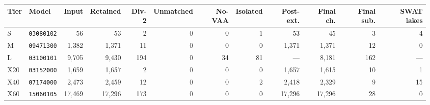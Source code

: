 \begin{tabular}{@{}llrrrrrrrrrr@{}}
\toprule
Tier & Model & Input & Retained & Div-2 & Unmatched & No-VAA & Isolated & Post-ext. & Final ch. & Final sub. & SWAT lakes \\
\midrule
S & \texttt{03080102} & 56 & 53 & 2 & 0 & 0 & 1 & 53 & 45 & 3 & 4 \\
M & \texttt{09471300} & 1{,}382 & 1{,}371 & 11 & 0 & 0 & 0 & 1{,}371 & 1{,}371 & 12 & 0 \\
L & \texttt{03100101} & 9{,}705 & 9{,}430 & 194 & 0 & 34 & 81 & --- & 8{,}181 & 162 & --- \\
X20 & \texttt{03152000} & 1{,}659 & 1{,}657 & 2 & 0 & 0 & 0 & 1{,}657 & 1{,}615 & 10 & 1 \\
X40 & \texttt{07174000} & 2{,}473 & 2{,}459 & 12 & 0 & 0 & 2 & 2{,}418 & 2{,}329 & 9 & 15 \\
X60 & \texttt{15060105} & 17{,}469 & 17{,}296 & 173 & 0 & 0 & 0 & 17{,}296 & 17{,}296 & 28 & 0 \\
\bottomrule
\end{tabular}
